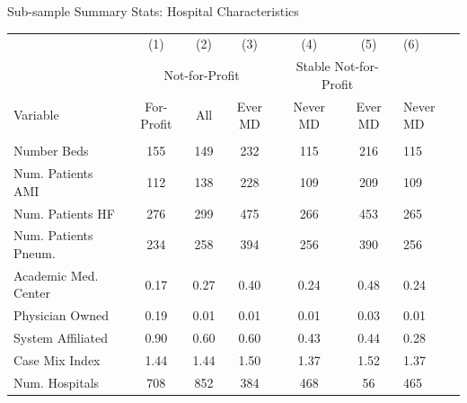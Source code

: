 \documentclass[notes,11pt, aspectratio=169]{beamer}
\begin{document}
\begin{frame}[noframenumbering]{Sub-sample Summary Stats: Hospital Characteristics}
    \begin{table}[ht!]
    \small
\centering
\begin{tabular}[t]{lcccccl}
\toprule
 & (1) & (2) & (3) & (4) & (5) & (6)\\
\addlinespace[0.3em]
\multicolumn{2}{c}{ } & \multicolumn{3}{c}{Not-for-Profit} & \multicolumn{2}{c}{Stable Not-for-Profit} \\
\cmidrule(l{3pt}r{3pt}){3-5} \cmidrule(l{3pt}r{3pt}){6-7}
Variable & For-Profit & All & Ever MD & Never MD & Ever MD & Never MD\\
\midrule
\addlinespace[0.3em]
\multicolumn{7}{l}{\textbf{Hospital Characteristics}}\\
\hspace{1em}Number Beds & 155 & 149 & 232 & 115 & 216 & 115\\
\hspace{1em}Num. Patients AMI & 112 & 138 & 228 & 109 & 209 & 109\\
\hspace{1em}Num. Patients HF & 276 & 299 & 475 & 266 & 453 & 265\\
\hspace{1em}Num. Patients Pneum. & 234 & 258 & 394 & 256 & 390 & 256\\
\hspace{1em}Academic Med. Center & 0.17 & 0.27 & 0.40 & 0.24 & 0.48 & 0.24\\
\hspace{1em}Physician Owned & 0.19 & 0.01 & 0.01 & 0.01 & 0.03 & 0.01\\
\hspace{1em}System Affiliated & 0.90 & 0.60 & 0.60 & 0.43 & 0.44 & 0.28\\
\hspace{1em}Case Mix Index & 1.44 & 1.44 & 1.50 & 1.37 & 1.52 & 1.37\\
\addlinespace[0.3em]
Num. Hospitals & 708 & 852 & 384 & 468 & 56 & 465\\
\bottomrule
\end{tabular}
\end{table}
\end{frame}
\end{document}
